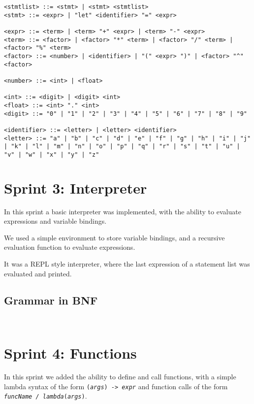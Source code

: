 \documentclass[a4paper, oneside, 11pt]{report}
\begin{document}
\begin{verbatim}
<stmtlist> ::= <stmt> | <stmt> <stmtlist>
<stmt> ::= <expr> | "let" <identifier> "=" <expr>

<expr> ::= <term> | <term> "+" <expr> | <term> "-" <expr>
<term> ::= <factor> | <factor> "*" <term> | <factor> "/" <term> | <factor> "%" <term>
<factor> ::= <number> | <identifier> | "(" <expr> ")" | <factor> "^" <factor>

<number> ::= <int> | <float>

<int> ::= <digit> | <digit> <int>
<float> ::= <int> "." <int>
<digit> ::= "0" | "1" | "2" | "3" | "4" | "5" | "6" | "7" | "8" | "9"

<identifier> ::= <letter> | <letter> <identifier>
<letter> ::= "a" | "b" | "c" | "d" | "e" | "f" | "g" | "h" | "i" | "j" | "k" | "l" | "m" | "n" | "o" | "p" | "q" | "r" | "s" | "t" | "u" | "v" | "w" | "x" | "y" | "z"
\end{verbatim}

\section{Sprint 3: Interpreter}\label{sec:interpreter}

In this sprint a basic interpreter was implemented, with the ability to evaluate expressions and variable bindings.

We used a simple environment to store variable bindings, and a recursive evaluation function to evaluate expressions.

It was a REPL style interpreter, where the last expression of a statement list was evaluated and printed.

\subsection{Grammar in BNF}\label{subsec:grammar-in-bnf3}

\begin{verbatim}
    
\end{verbatim}

\section{Sprint 4: Functions}\label{sec:functions}

In this sprint we added the ability to define and call functions, with a simple lambda syntax of the form 
\texttt{(\textit{args}) -> \textit{expr}} and function calls of the form \texttt{\textit{funcName / lambda}(\textit{args})}.
\end{document}
